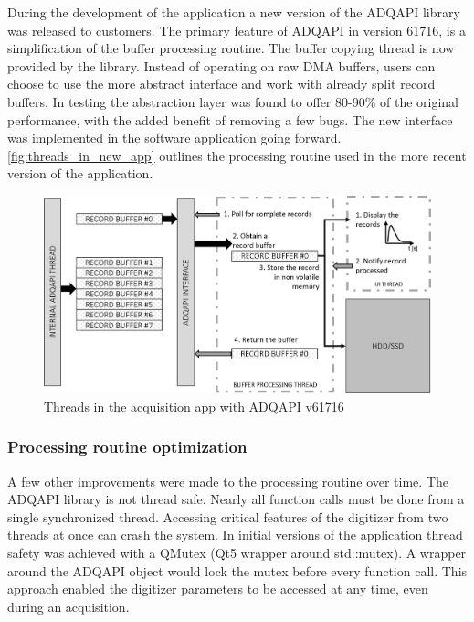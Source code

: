 During the development of the application a new version of the ADQAPI library
was released to customers. The primary feature of ADQAPI in version 61716,
is a simplification of the buffer processing routine. The buffer copying thread
is now provided by the library. Instead of operating on raw DMA buffers,
users can choose to use the more abstract interface and work with already
split record buffers. In testing the abstraction layer was found to offer 80-90\% 
of the original performance, with the added benefit of removing a few bugs.
The new interface was implemented in the software application going forward.
\autoref{fig:threads_in_new_app} outlines the processing routine used in the more recent
version of the application.

\begin{figure}[H]
  \centering
  \includegraphics[width=\linewidth]{media/threads_in_new_app.png}
  \caption{Threads in the acquisition app with ADQAPI v61716}
  \label{fig:threads_in_new_app} 
\end{figure}

\subsubsection{Processing routine optimization}

A few other improvements were made to the processing routine over time.
The ADQAPI library is not thread safe. Nearly all function calls
must be done from a single synchronized thread. Accessing critical features
of the digitizer from two threads at once can crash the system.
In initial versions of the application thread safety was achieved
with a QMutex (Qt5 wrapper around std::mutex). A wrapper around the ADQAPI object
would lock the mutex before every function call. This approach enabled
the digitizer parameters to be accessed at any time, even during an acquisition.


